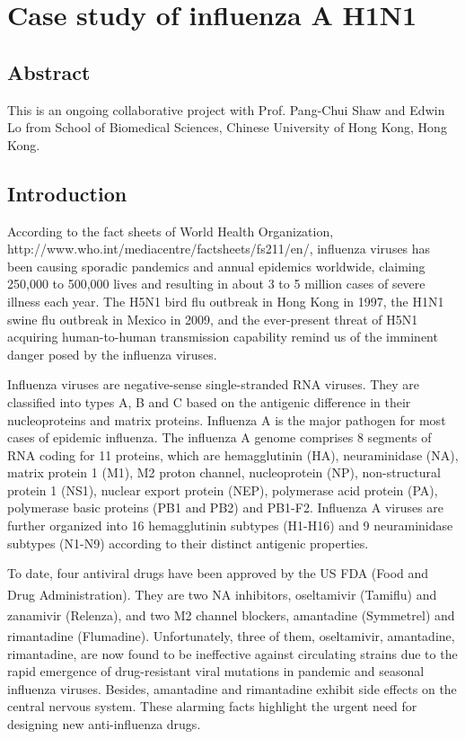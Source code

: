 \chapter{Case study of influenza A H1N1}

\section{Abstract}

This is an ongoing collaborative project with Prof. Pang-Chui Shaw and Edwin Lo from School of Biomedical Sciences, Chinese University of Hong Kong, Hong Kong.

\section{Introduction}

According to the fact sheets of World Health Organization, http://www.who.int/mediacentre/factsheets/fs211/en/, influenza viruses has been causing sporadic pandemics and annual epidemics worldwide, claiming 250,000 to 500,000 lives and resulting in about 3 to 5 million cases of severe illness each year. The H5N1 bird flu outbreak in Hong Kong in 1997, the H1N1 swine flu outbreak in Mexico in 2009, and the ever-present threat of H5N1 acquiring human-to-human transmission capability remind us of the imminent danger posed by the influenza viruses. 

Influenza viruses are negative-sense single-stranded RNA viruses. They are classified into types A, B and C based on the antigenic difference in their nucleoproteins and matrix proteins. Influenza A is the major pathogen for most cases of epidemic influenza. The influenza A genome comprises 8 segments of RNA coding for 11 proteins, which are hemagglutinin (HA), neuraminidase (NA), matrix protein 1 (M1), M2 proton channel, nucleoprotein (NP), non-structural protein 1 (NS1), nuclear export protein (NEP), polymerase acid protein (PA), polymerase basic proteins (PB1 and PB2) and PB1-F2. Influenza A viruses are further organized into 16 hemagglutinin subtypes (H1-H16) and 9 neuraminidase subtypes (N1-N9) according to their distinct antigenic properties.

To date, four antiviral drugs have been approved by the US FDA (Food and Drug Administration). They are two NA inhibitors, oseltamivir (Tamiflu\textsuperscript{\textregistered}) and zanamivir (Relenza\textsuperscript{\textregistered}), and two M2 channel blockers, amantadine (Symmetrel\textsuperscript{\textregistered}) and rimantadine (Flumadine\textsuperscript{\textregistered}). Unfortunately, three of them, oseltamivir, amantadine, rimantadine, are now found to be ineffective against circulating strains due to the rapid emergence of drug-resistant viral mutations in pandemic and seasonal influenza viruses. Besides, amantadine and rimantadine exhibit side effects on the central nervous system. These alarming facts highlight the urgent need for designing new anti-influenza drugs.

